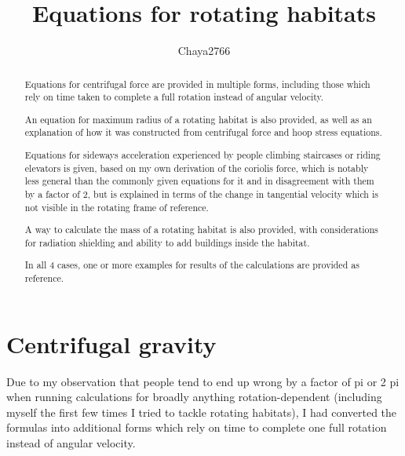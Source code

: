 \documentclass[a4paper]{article}
\title{Equations for rotating habitats}
\author{Chaya2766}
\begin{document}
	\sffamily
	\sloppy
	
	\maketitle
	
	\vfill
	
	\begin{abstract}
		Equations for centrifugal force are provided in multiple forms, including those which rely on time taken to complete a full rotation instead of angular velocity.
		
		\medskip
		
		An equation for maximum radius of a rotating habitat is also provided, as well as an explanation of how it was constructed from centrifugal force and hoop stress equations.
		
		\medskip
		
		Equations for sideways acceleration experienced by people climbing staircases or riding elevators is given, based on my own derivation of the coriolis force, which is notably less general than the commonly given equations for it and in disagreement with them by a factor of 2, but is explained in terms of the change in tangential velocity which is not visible in the rotating frame of reference.
		
		\medskip
		
		A way to calculate the mass of a rotating habitat is also provided, with considerations for radiation shielding and ability to add buildings inside the habitat.
		
		\medskip
		
		In all 4 cases, one or more examples for results of the calculations are provided as reference.
	\end{abstract}
	
	\vfill
	
	\tableofcontents
	
	\pagebreak
	
	\section{Centrifugal gravity}
	
	Due to my observation that people tend to end up wrong by a factor of pi or 2 pi when running calculations for broadly anything rotation-dependent (including myself the first few times I tried to tackle rotating habitats), I had converted the formulas into additional forms which rely on time to complete one full rotation instead of angular velocity.
	
\end{document}
